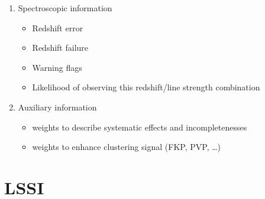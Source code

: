 \documentclass[11pt]{article}
\begin{document}
\begin{enumerate}
\begin{itemize}
\end{itemize}
\item Spectroscopic information
\begin{itemize}
\item Redshift error
\item Redshift failure
\item Warning flags
\item Likelihood of observing this redshift/line strength combination
\end{itemize}
\item Auxiliary information
\begin{itemize}
\item weights to describe systematic effects and incompletenesses
\item weights to enhance clustering signal (FKP, PVP, \ldots)
\end{itemize}
\end{enumerate}

\section{LSSI}
\end{document}

